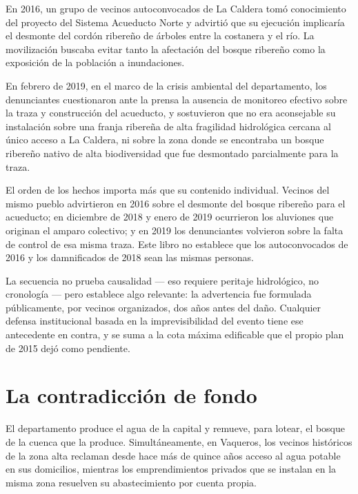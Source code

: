 En 2016, un grupo de vecinos autoconvocados de La Caldera tomó conocimiento del proyecto del Sistema Acueducto Norte y advirtió que su ejecución implicaría el desmonte del cordón ribereño de árboles entre la costanera y el río. La movilización buscaba evitar tanto la afectación del bosque ribereño como la exposición de la población a inundaciones.

En febrero de 2019, en el marco de la crisis ambiental del departamento, los denunciantes cuestionaron ante la prensa la ausencia de monitoreo efectivo sobre la traza y construcción del acueducto, y sostuvieron que no era aconsejable su instalación sobre una franja ribereña de alta fragilidad hidrológica cercana al único acceso a La Caldera, ni sobre la zona donde se encontraba un bosque ribereño nativo de alta biodiversidad que fue desmontado parcialmente para la traza.

\begin{cautela}
El orden de los hechos importa más que su contenido individual. Vecinos del mismo pueblo advirtieron en 2016 sobre el desmonte del bosque ribereño para el acueducto; en diciembre de 2018 y enero de 2019 ocurrieron los aluviones que originan el amparo colectivo; y en 2019 los denunciantes volvieron sobre la falta de control de esa misma traza. Este libro no establece que los autoconvocados de 2016 y los damnificados de 2018 sean las mismas personas.

La secuencia no prueba causalidad --- eso requiere peritaje hidrológico, no cronología --- pero establece algo relevante: la advertencia fue formulada públicamente, por vecinos organizados, dos años antes del daño. Cualquier defensa institucional basada en la imprevisibilidad del evento tiene ese antecedente en contra, y se suma a la cota máxima edificable que el propio plan de 2015 dejó como pendiente.
\end{cautela}

\section{La contradicción de fondo}

El departamento produce el agua de la capital y remueve, para lotear, el bosque de la cuenca que la produce. Simultáneamente, en Vaqueros, los vecinos históricos de la zona alta reclaman desde hace más de quince años acceso al agua potable en sus domicilios, mientras los emprendimientos privados que se instalan en la misma zona resuelven su abastecimiento por cuenta propia.


